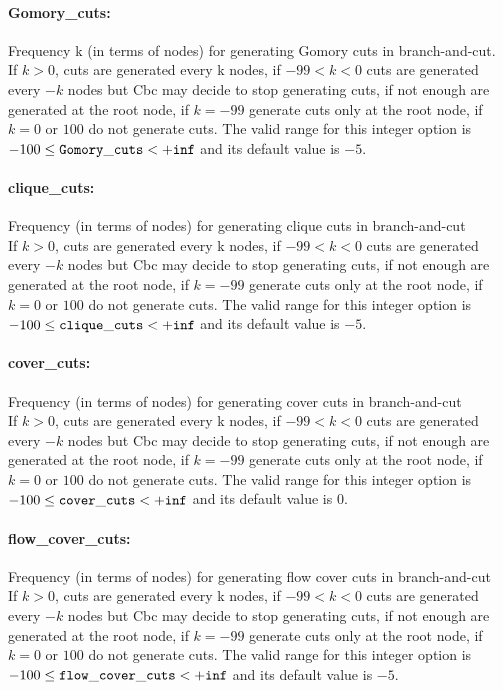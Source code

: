 \paragraph{\bf Gomory\_cuts:}\label{sec:Gomory_cuts} Frequency k (in terms of nodes) for generating Gomory cuts in branch-and-cut. $\;$ \\
 If $k > 0$, cuts are generated every k nodes, if
$-99 < k < 0$ cuts are generated every $-k$ nodes
but Cbc may decide to stop generating cuts, if
not enough are generated at the root node, if
$k=-99$ generate cuts only at the root node, if
$k=0$ or $100$ do not generate cuts. The valid range for this integer option is
$-100 \le {\tt Gomory\_cuts } <  {\tt +inf}$
and its default value is $-5$.


\paragraph{\bf clique\_cuts:}\label{sec:clique_cuts} Frequency (in terms of nodes) for generating clique cuts in branch-and-cut $\;$ \\
 If $k > 0$, cuts are generated every k nodes, if
$-99 < k < 0$ cuts are generated every $-k$ nodes
but Cbc may decide to stop generating cuts, if
not enough are generated at the root node, if
$k=-99$ generate cuts only at the root node, if
$k=0$ or $100$ do not generate cuts. The valid range for this integer option is
$-100 \le {\tt clique\_cuts } <  {\tt +inf}$
and its default value is $-5$.


\paragraph{\bf cover\_cuts:}\label{sec:cover_cuts} Frequency (in terms of nodes) for generating cover cuts in branch-and-cut $\;$ \\
 If $k > 0$, cuts are generated every k nodes, if
$-99 < k < 0$ cuts are generated every $-k$ nodes
but Cbc may decide to stop generating cuts, if
not enough are generated at the root node, if
$k=-99$ generate cuts only at the root node, if
$k=0$ or $100$ do not generate cuts. The valid range for this integer option is
$-100 \le {\tt cover\_cuts } <  {\tt +inf}$
and its default value is $0$.


\paragraph{\bf flow\_cover\_cuts:}\label{sec:flow_cover_cuts} Frequency (in terms of nodes) for generating flow cover cuts in branch-and-cut $\;$ \\
 If $k > 0$, cuts are generated every k nodes, if
$-99 < k < 0$ cuts are generated every $-k$ nodes
but Cbc may decide to stop generating cuts, if
not enough are generated at the root node, if
$k=-99$ generate cuts only at the root node, if
$k=0$ or $100$ do not generate cuts. The valid range for this integer option is
$-100 \le {\tt flow\_cover\_cuts } <  {\tt +inf}$
and its default value is $-5$.


